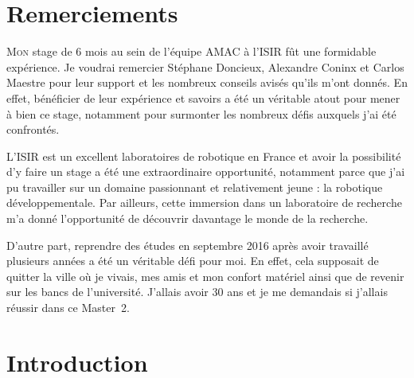 \documentclass{llncs}
\begin{document}
\section*{Remerciements}

\lettrine{M}{on} stage de 6 mois au sein de l'équipe AMAC à l'ISIR fût une formidable expérience. Je voudrai remercier Stéphane Doncieux, Alexandre Coninx et Carlos Maestre pour leur support et les nombreux conseils avisés qu'ils m'ont donnés. En effet, bénéficier de leur expérience et savoirs a été un véritable atout pour mener à bien ce stage, notamment pour surmonter les nombreux défis auxquels j'ai été confrontés.

L'ISIR est un excellent laboratoires de robotique en France et avoir la possibilité d'y faire un stage a été une extraordinaire opportunité, notamment parce que j'ai pu travailler sur un domaine passionnant et relativement jeune : la robotique développementale. Par ailleurs, cette immersion dans un laboratoire de recherche m'a donné l'opportunité de découvrir davantage le monde de la recherche.

D'autre part, reprendre des études en septembre 2016 après avoir travaillé plusieurs années a été un véritable défi pour moi. En effet, cela supposait de quitter la ville où je vivais, mes amis et mon confort matériel ainsi que de revenir sur les bancs de l'université. J'allais avoir 30 ans et je me demandais si j'allais réussir dans ce Master~2.




\section{Introduction}



\end{document}
